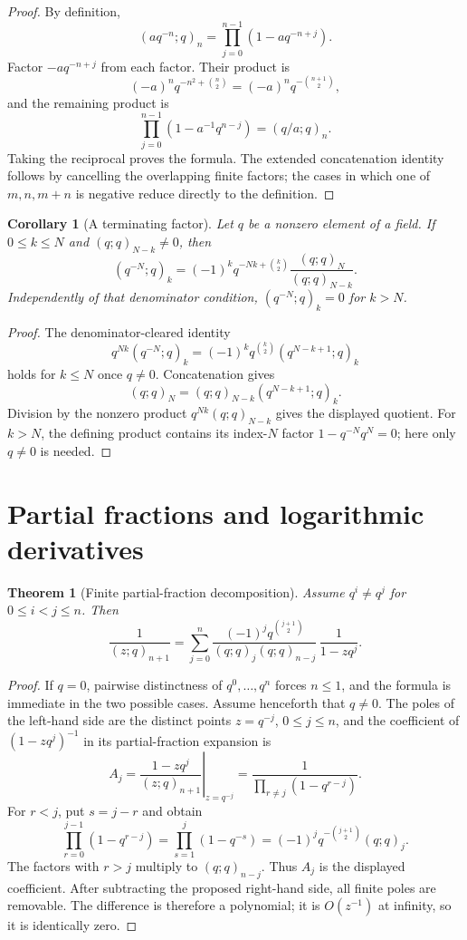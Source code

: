 \documentclass[11pt,a4paper,oneside,openany]{book}
\newtheorem{theorem}{Theorem}[chapter]
\newtheorem{corollary}[corollary]{Corollary}
\theoremstyle{definition}
\theoremstyle{remark}
\begin{document}
\begin{proof}
By definition,
\[
 (aq^{-n};q)_n=\prod_{j=0}^{n-1}(1-aq^{-n+j}).
\]
Factor $-a q^{-n+j}$ from each factor.  Their product is
\[
 (-a)^nq^{-n^2+\binom n2}=(-a)^nq^{-\binom{n+1}{2}},
\]
and the remaining product is
\[
 \prod_{j=0}^{n-1}(1-a^{-1}q^{n-j})=(q/a;q)_n.
\]
Taking the reciprocal proves the formula.  The extended concatenation identity follows by cancelling the overlapping finite factors; the cases in which one of $m,n,m+n$ is negative reduce directly to the definition.
\end{proof}

\begin{corollary}[A terminating factor]\label{cor:qminusN}
Let $q$ be a nonzero element of a field.  If $0\le k\le N$ and
$(q;q)_{N-k}\ne0$, then
\[
 (q^{-N};q)_k=(-1)^kq^{-Nk+\binom k2}
 \frac{(q;q)_N}{(q;q)_{N-k}}.
\]
Independently of that denominator condition, $(q^{-N};q)_k=0$ for $k>N$.
\end{corollary}

\begin{proof}
The denominator-cleared identity
\[
 q^{Nk}(q^{-N};q)_k
 =(-1)^kq^{\binom k2}(q^{N-k+1};q)_k
\]
holds for $k\le N$ once $q\ne0$.  Concatenation gives
\[
 (q;q)_N=(q;q)_{N-k}(q^{N-k+1};q)_k.
\]
Division by the nonzero product $q^{Nk}(q;q)_{N-k}$ gives the displayed
quotient.  For $k>N$, the defining product contains its index-$N$ factor
$1-q^{-N}q^N=0$; here only $q\ne0$ is needed.
\end{proof}

\section{Partial fractions and logarithmic derivatives}

\begin{theorem}[Finite partial-fraction decomposition]\label{thm:partial-fraction}
Assume $q^i\ne q^j$ for $0\le i<j\le n$.  Then
\[
 \frac{1}{(z;q)_{n+1}}
 =\sum_{j=0}^{n}
 \frac{(-1)^j q^{\binom{j+1}{2}}}
 {(q;q)_j(q;q)_{n-j}}\,
 \frac{1}{1-zq^j}.
\]
\end{theorem}

\begin{proof}
If $q=0$, pairwise distinctness of $q^0,\ldots,q^n$ forces $n\le1$, and the
formula is immediate in the two possible cases.  Assume henceforth that
$q\ne0$.  The poles of the left-hand side are the distinct points
$z=q^{-j}$, $0\le j\le n$, and the coefficient of $(1-zq^j)^{-1}$ in its
partial-fraction expansion is
\[
 A_j=\left.\frac{1-zq^j}{(z;q)_{n+1}}\right|_{z=q^{-j}}
 =\frac{1}{\prod_{r\ne j}(1-q^{r-j})}.
\]
For $r<j$, put $s=j-r$ and obtain
\[
 \prod_{r=0}^{j-1}(1-q^{r-j})
 =\prod_{s=1}^{j}(1-q^{-s})
 =(-1)^jq^{-\binom{j+1}{2}}(q;q)_j.
\]
The factors with $r>j$ multiply to $(q;q)_{n-j}$.  Thus $A_j$ is the
displayed coefficient.  After subtracting the proposed right-hand side, all
finite poles are removable.  The difference is therefore a polynomial; it is
$O(z^{-1})$ at infinity, so it is identically zero.
\end{proof}
\end{document}
